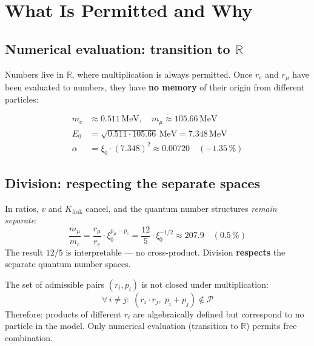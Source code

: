 \section{What Is Permitted and Why}

\subsection{Numerical evaluation: transition to $\mathbb{R}$}

Numbers live in $\mathbb{R}$, where multiplication is always permitted.
Once $r_e$ and $r_\mu$ have been evaluated to numbers, they have
\textbf{no memory} of their origin from different particles:

\begin{align*}
  m_e &\approx 0.511\,\text{MeV}, \quad
  m_\mu \approx 105.66\,\text{MeV} \\
  E_0 &= \sqrt{0.511 \cdot 105.66}\,\text{MeV} = 7.348\,\text{MeV} \\
  \alpha &= \xi_0 \cdot (7.348)^2 \approx 0.00720 \quad (-1.35\,\%)
\end{align*}

\subsection{Division: respecting the separate spaces}

In ratios, $v$ and $K_{\text{frak}}$ cancel, and the quantum number
structures \emph{remain separate}:
\[
  \frac{m_\mu}{m_e}
  = \frac{r_\mu}{r_e} \cdot \xi_0^{p_\mu - p_e}
  = \frac{12}{5} \cdot \xi_0^{-1/2}
  \approx 207.9 \quad (0.5\,\%)
\]
The result $12/5$ is interpretable --- no cross-product.
Division \textbf{respects} the separate quantum number spaces.

\begin{tcolorbox}[colback=blue!5, colframe=blue!60!black, boxrule=0.5pt,
  arc=2pt, left=3mm, right=3mm, fontupper=\small,
  title={Basic rule --- The non-closure condition}]
The set of admissible pairs $(r_i, p_i)$ is not closed under multiplication:
\[
  \boxed{\forall\, i \neq j:\; (r_i \cdot r_j,\; p_i + p_j) \notin \mathcal{P}}
\]
Therefore: products of different $r_i$ are algebraically defined
but correspond to no particle in the model.
Only numerical evaluation (transition to $\mathbb{R}$) permits
free combination.
\end{tcolorbox}

